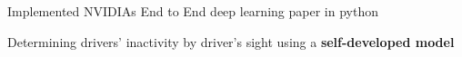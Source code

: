 \documentclass[]{deedy-resume-openfont}
\begin{document}
\begin{minipage}[t]{0.66\textwidth}
\begin{tightemize}
\item Implemented NVIDIAs End to End deep learning paper in python\\
\item Determining drivers' inactivity by driver's sight using a \textbf{self-developed model}\\
\end{tightemize}








\end{minipage} 
\end{document}
